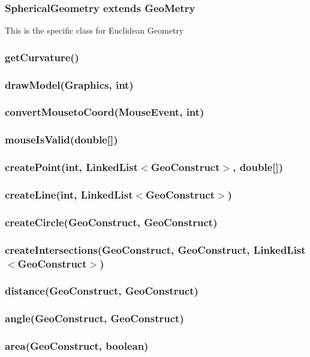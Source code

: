 \documentclass[a4paper,10pt]{report}
\begin{document}
\subsubsection{SphericalGeometry extends GeoMetry} This is the specific class for Euclidean Geometry
\subsubsection{getCurvature()}
\subsubsection{drawModel(Graphics, int)}
\subsubsection{convertMousetoCoord(MouseEvent, int)}
\subsubsection{mouseIsValid(double[])}
\subsubsection{createPoint(int, LinkedList$<$GeoConstruct$>$, double[])}
\subsubsection{createLine(int, LinkedList$<$GeoConstruct$>$)}
\subsubsection{createCircle(GeoConstruct, GeoConstruct)}
\subsubsection{createIntersections(GeoConstruct, GeoConstruct, LinkedList$<$GeoConstruct$>$)}
\subsubsection{distance(GeoConstruct, GeoConstruct)}
\subsubsection{angle(GeoConstruct, GeoConstruct)}
\subsubsection{area(GeoConstruct, boolean)}
\end{document}

